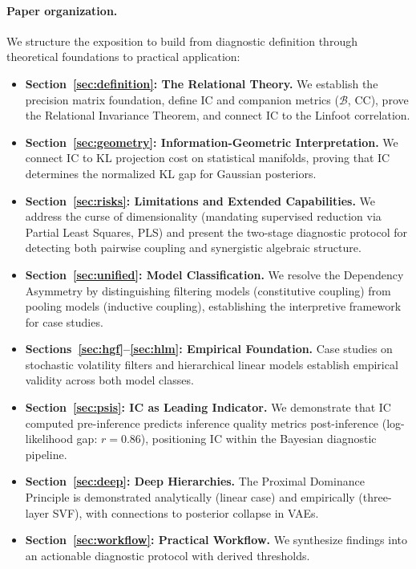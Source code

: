\documentclass[10pt]{article} %
\theoremstyle{plain}
\theoremstyle{definition}
\newcommand{\BB}{\mathcal{B}}  %
\newcommand{\CC}{\mathrm{CC}}  %
\begin{document}
\paragraph{Paper organization.} We structure the exposition to build from diagnostic definition through theoretical foundations to practical application:
\begin{itemize}
    \item \textbf{Section~\ref{sec:definition}: The Relational Theory.} We establish the precision matrix foundation, define IC and companion metrics ($\BB$, $\CC$), prove the Relational Invariance Theorem, and connect IC to the Linfoot correlation.
    \item \textbf{Section~\ref{sec:geometry}: Information-Geometric Interpretation.} We connect IC to KL projection cost on statistical manifolds, proving that IC determines the normalized KL gap for Gaussian posteriors.
    \item \textbf{Section~\ref{sec:risks}: Limitations and Extended Capabilities.} We address the curse of dimensionality (mandating supervised reduction via Partial Least Squares, PLS) and present the two-stage diagnostic protocol for detecting both pairwise coupling and synergistic algebraic structure.
    \item \textbf{Section~\ref{sec:unified}: Model Classification.} We resolve the Dependency Asymmetry by distinguishing filtering models (constitutive coupling) from pooling models (inductive coupling), establishing the interpretive framework for case studies.
    \item \textbf{Sections~\ref{sec:hgf}--\ref{sec:hlm}: Empirical Foundation.} Case studies on stochastic volatility filters and hierarchical linear models establish empirical validity across both model classes.
    \item \textbf{Section~\ref{sec:psis}: IC as Leading Indicator.} We demonstrate that IC computed pre-inference predicts inference quality metrics post-inference (log-likelihood gap: $r = 0.86$), positioning IC within the Bayesian diagnostic pipeline.
    \item \textbf{Section~\ref{sec:deep}: Deep Hierarchies.} The Proximal Dominance Principle is demonstrated analytically (linear case) and empirically (three-layer SVF), with connections to posterior collapse in VAEs.
    \item \textbf{Section~\ref{sec:workflow}: Practical Workflow.} We synthesize findings into an actionable diagnostic protocol with derived thresholds.
\end{itemize}
\end{document}
